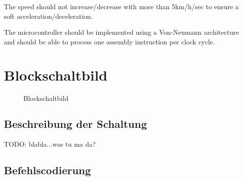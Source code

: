 \documentclass[a4paper,10pt]{scrartcl}
\begin{document}
The speed should not increase/decrease with more than 5km/h/sec to ensure a soft acceleration/deceleration. 

The microcontroller should be implemented using a Von-Neumann architecture and should be able to process one assembly instruction per clock cycle. 


\section{Blockschaltbild}
\label{sec:block}


\begin{figure}[ht]
	\centering
\noindent{}
	\caption{Blockschaltbild}
	\label{fig:block}
\end{figure}

\clearpage


\subsection{Beschreibung der Schaltung}
\label{sec:schaltung}

TODO: blabla...was tu ma da?


\subsection{Befehlscodierung}
\label{sec:bef_cod}

\end{document}
